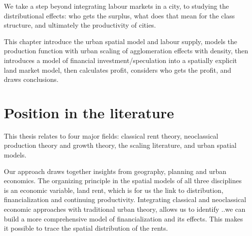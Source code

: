 We take a step beyond integrating labour markets in a city, to studying the distributional effects: who gets the surplus, what does that mean for the class structure, and ultimately the productivity of cities. 

This chapter introduce the urban spatial model and labour supply, models the production function with urban scaling of agglomeration effects with density, then introduces a model of financial investment/speculation into a spatially explicit land market model, then calculates profit, considers who gets the profit, and draws conclusions. 
 

\section{Position in the literature}
This thesis relates to four major fields: classical rent theory, neoclassical production theory and growth theory, the scaling literature, and urban spatial models.

Our approach draws together insights from %
geography, planning and urban economics. 
The organizing principle in the spatial models of all three disciplines is an economic variable, land rent, which is for us the link to distribution, financialization and continuing productivity. %
Integrating classical and neoclassical economic approaches with traditional urban theory,  allows us to identify 
..we can build a more comprehensive model of financialization and its effects. This makes it possible to trace the spatial distribution of the rents.

